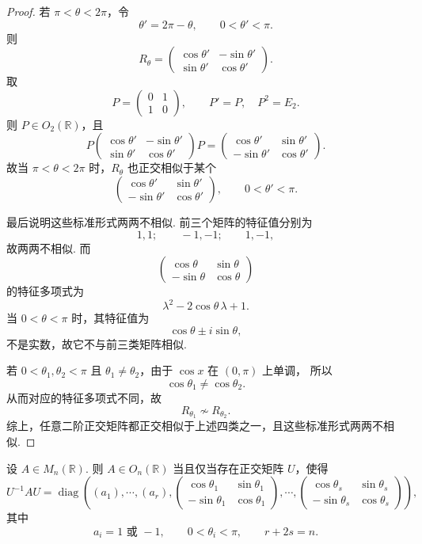 \begin{proof}
	若 $\pi<\theta<2\pi$，令
	\[
	\theta'=2\pi-\theta,
	\qquad 0<\theta'<\pi.
	\]
	则
	\[
	R_\theta=
	\begin{pmatrix}
		\cos\theta'&-\sin\theta'\\
		\sin\theta'&\cos\theta'
	\end{pmatrix}.
	\]
	取
	\[
	P=
	\begin{pmatrix}
		0&1\\
		1&0
	\end{pmatrix},
	\qquad P'=P,\quad P^2=E_2.
	\]
	则 $P\in O_2(\mathbb R)$，且
	\[
	P
	\begin{pmatrix}
		\cos\theta'&-\sin\theta'\\
		\sin\theta'&\cos\theta'
	\end{pmatrix}
	P
	=
	\begin{pmatrix}
		\cos\theta'&\sin\theta'\\
		-\sin\theta'&\cos\theta'
	\end{pmatrix}.
	\]
	故当 $\pi<\theta<2\pi$ 时，$R_\theta$ 也正交相似于某个
	\[
	\begin{pmatrix}
		\cos\theta'&\sin\theta'\\
		-\sin\theta'&\cos\theta'
	\end{pmatrix},
	\qquad 0<\theta'<\pi.
	\]
	
	最后说明这些标准形式两两不相似.
	前三个矩阵的特征值分别为
	\[
	1,1;\qquad -1,-1;\qquad 1,-1,
	\]
	故两两不相似. 而
	\[
	\begin{pmatrix}
		\cos\theta&\sin\theta\\
		-\sin\theta&\cos\theta
	\end{pmatrix}
	\]
	的特征多项式为
	\[
	\lambda^2-2\cos\theta\,\lambda+1.
	\]
	当 $0<\theta<\pi$ 时，其特征值为
	\[
	\cos\theta\pm i\sin\theta,
	\]
	不是实数，故它不与前三类矩阵相似.
	
	若 $0<\theta_1,\theta_2<\pi$ 且 $\theta_1\ne \theta_2$，由于 $\cos x$ 在 $(0,\pi)$ 上单调，
	所以
	\[
	\cos\theta_1\ne \cos\theta_2.
	\]
	从而对应的特征多项式不同，故
	\[
	R_{\theta_1}\nsim R_{\theta_2}.
	\]
	综上，任意二阶正交矩阵都正交相似于上述四类之一，且这些标准形式两两不相似.
\end{proof}

\begin{theorem}
	设 $A\in M_n(\mathbb{R})$. 则 $A\in O_n(\mathbb{R})$ 当且仅当存在正交矩阵 $U$，使得
	\[
	U^{-1}AU=	\operatorname{diag}\left((a_1),\cdots,(a_r),
	\begin{pmatrix}\cos\theta_1&\sin\theta_1\\-\sin\theta_1&\cos\theta_1\end{pmatrix},
	\cdots,
	\begin{pmatrix}\cos\theta_s&\sin\theta_s\\-\sin\theta_s&\cos\theta_s\end{pmatrix}
	\right),
	\]
	其中
	\[
	a_i=1\text{ 或 }-1,
	\qquad
	0<\theta_i<\pi,
	\qquad
	r+2s=n.
	\]
\end{theorem}

